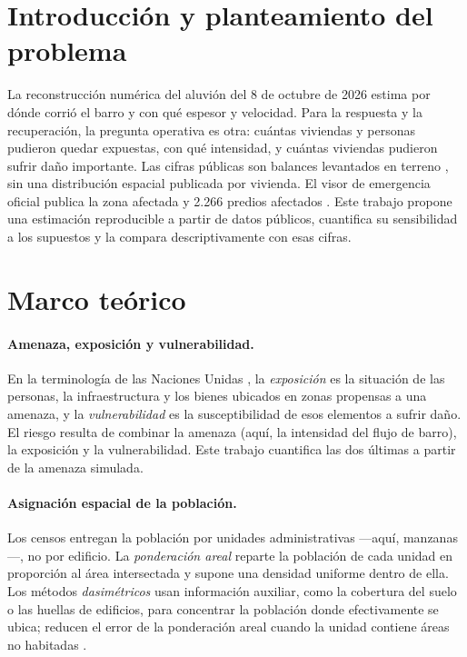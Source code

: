 \documentclass[10pt,a4paper]{article}
\begin{document}
\section{Introducción y planteamiento del problema}
La reconstrucción numérica del aluvión del 8 de octubre de 2026 \citep{wood2026} estima por dónde corrió el barro y con qué espesor y velocidad. Para la respuesta y la recuperación, la pregunta operativa es otra: cuántas viviendas y personas pudieron quedar expuestas, con qué intensidad, y cuántas viviendas pudieron sufrir daño importante. Las cifras públicas son balances levantados en terreno \citep{senapred2026latribuna,cnn2026balance,latercera2026senapred}, sin una distribución espacial publicada por vivienda. El visor de emergencia oficial publica la zona afectada y 2.266 predios afectados \citep{bbnn2026visor}. Este trabajo propone una estimación reproducible a partir de datos públicos, cuantifica su sensibilidad a los supuestos y la compara descriptivamente con esas cifras.

\section{Marco teórico}
\paragraph{Amenaza, exposición y vulnerabilidad.} En la terminología de las Naciones Unidas \citep{undrr2016}, la \emph{exposición} es la situación de las personas, la infraestructura y los bienes ubicados en zonas propensas a una amenaza, y la \emph{vulnerabilidad} es la susceptibilidad de esos elementos a sufrir daño. El riesgo resulta de combinar la amenaza (aquí, la intensidad del flujo de barro), la exposición y la vulnerabilidad. Este trabajo cuantifica las dos últimas a partir de la amenaza simulada.
\paragraph{Asignación espacial de la población.} Los censos entregan la población por unidades administrativas ---aquí, manzanas---, no por edificio. La \emph{ponderación areal} reparte la población de cada unidad en proporción al área intersectada y supone una densidad uniforme dentro de ella. Los métodos \emph{dasimétricos} usan información auxiliar, como la cobertura del suelo o las huellas de edificios, para concentrar la población donde efectivamente se ubica; reducen el error de la ponderación areal cuando la unidad contiene áreas no habitadas \citep{eicher2001,mennis2003}.
\end{document}
